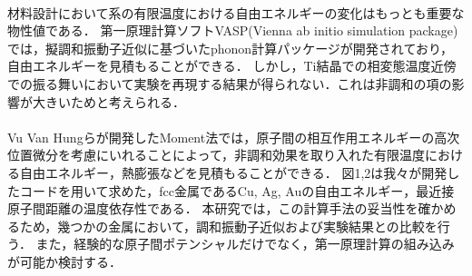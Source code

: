 \documentclass[12pt, a4paper]{jarticle}
\newcommand{\講演番号}
{}
\newcommand{\講演題目}
{非調和振動の効果を入れた有限温度自由エネルギー計算}
\newcommand{\英文題目}
{Free energy calculation of finite temperature with anharmonic effects.}
\newcommand{\和文所属}
{関西学院大・理工}
\newcommand{\和文氏名}
{榊原健，西谷滋人}
\newcommand{\英文所属}
{Department of Informatics, Kwansei Gakuin Univ}
\newcommand{\英文氏名}
{K. Sakakibara, and S. R. Nishitani}
\newlength\題目幅
\newlength\ヘッダ項目間隔
\newlength\所属インデント
\newlength\和文氏名インデント
\newlength\英文氏名インデント
\newlength\最小所属氏名間隔
\newlength\ヘッダ行間隔
\newlength\本文行間隔
\newlength\上端余白
\newlength\左端余白
\begin{document}
\setlength\parindent{1zw}\setlength\baselineskip{\本文行間隔}
\vspace*{\本文行間隔}



\paragraph{}
材料設計において系の有限温度における自由エネルギーの変化はもっとも重要な物性値である．
第一原理計算ソフトVASP(Vienna ab initio simulation package)では，擬調和振動子近似に基づいたphonon計算パッケージが開発されており，自由エネルギーを見積もることができる\cite{phonon}．
しかし，Ti結晶での相変態温度近傍での振る舞いにおいて実験を再現する結果が得られない．これは非調和の項の影響が大きいためと考えられる．
\paragraph{}
Vu Van Hungらが開発したMoment法では，原子間の相互作用エネルギーの高次位置微分を考慮にいれることによって，非調和効果を取り入れた有限温度における自由エネルギー，熱膨張などを見積もることができる\cite{jindo}．
図1,2は我々が開発したコードを用いて求めた，fcc金属であるCu, Ag, Auの自由エネルギー，最近接原子間距離の温度依存性である．
本研究では，この計算手法の妥当性を確かめるため，幾つかの金属において，調和振動子近似および実験結果との比較を行う．
また，経験的な原子間ポテンシャルだけでなく，第一原理計算の組み込みが可能か検討する．
\end{document}
